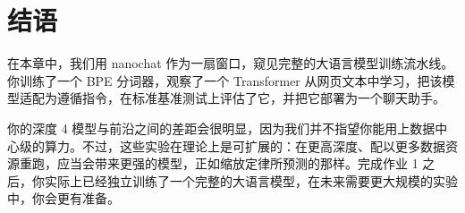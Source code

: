 \section{结语}
\label{sec:conclusion}

在本章中，我们用 nanochat 作为一扇窗口，窥见完整的大语言模型训练流水线。你训练了一个 BPE 分词器，观察了一个 Transformer 从网页文本中学习，把该模型适配为遵循指令，在标准基准测试上评估了它，并把它部署为一个聊天助手。

你的深度 4 模型与前沿之间的差距会很明显，因为我们并不指望你能用上数据中心级的算力。不过，这些实验在理论上是可扩展的：在更高深度、配以更多数据资源重跑，应当会带来更强的模型，正如缩放定律所预测的那样。完成作业 1 之后，你实际上已经独立训练了一个完整的大语言模型，在未来需要更大规模的实验中，你会更有准备。





